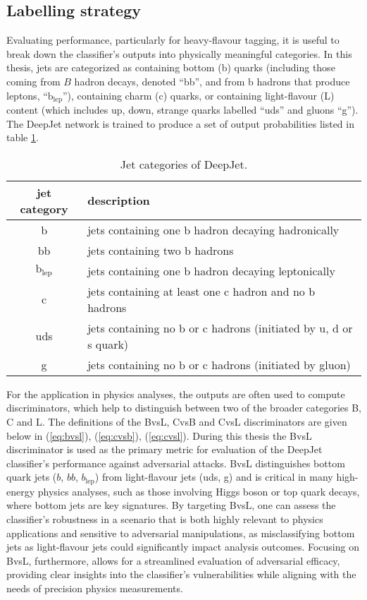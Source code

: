 \subsection{Labelling strategy}

Evaluating performance, particularly for heavy-flavour tagging, it is useful to break down the classifier’s outputs into physically meaningful categories. In this thesis, jets are categorized as containing bottom (b) quarks (including those coming from $B$ hadron decays, denoted “bb”, and from b hadrons that produce leptons, “$\text{b}_\text{lep}$”), containing charm (c) quarks, or containing light-flavour (L) content (which includes up, down, strange quarks labelled “uds” and gluons “g”). The DeepJet network is trained to produce a set of output probabilities listed in table \ref{tab:jet_categories}.

\begin{table}[ht]
\centering
\caption{Jet categories of DeepJet.}
\begin{tabular}{|c|l|}
\hline
\textbf{jet category} & \textbf{description} \\
\hline
b & jets containing one b hadron decaying hadronically \\
\hline
bb & jets containing two b hadrons \\
\hline
$\text{b}_{\text{lep}}$ & jets containing one b hadron decaying leptonically \\
\hline
c & jets containing at least one c hadron and no b hadrons \\
\hline
uds & jets containing no b or c hadrons (initiated by u, d or s quark) \\
\hline
g & jets containing no b or c hadrons (initiated by gluon) \\
\hline
\end{tabular}
\label{tab:jet_categories}
\end{table}

For the application in physics analyses, the outputs are often used to compute discriminators, which help to distinguish between two of the broader categories B, C and L. The definitions of the BvsL, CvsB and CvsL discriminators are given below in (\ref{eq:bvsl}), (\ref{eq:cvsb}), (\ref{eq:cvsl}). During this thesis the BvsL discriminator is used as the primary metric for evaluation of the DeepJet classifier's performance against adversarial attacks. BvsL distinguishes bottom quark jets ($b$, $bb$, $b_{\text{lep}}$) from light-flavour jets (uds, g) and is critical in many high-energy physics analyses, such as those involving Higgs boson or top quark decays, where bottom jets are key signatures. By targeting BvsL, one can assess the classifier’s robustness in a scenario that is both highly relevant to physics applications and sensitive to adversarial manipulations, as misclassifying bottom jets as light-flavour jets could significantly impact analysis outcomes. Focusing on BvsL, furthermore, allows for a streamlined evaluation of adversarial efficacy, providing clear insights into the classifier’s vulnerabilities while aligning with the needs of precision physics measurements.

